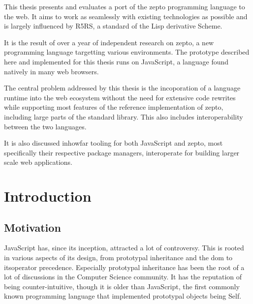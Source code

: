 \documentclass[oneside,11pt,xetex]{scrbook}
\begin{document}

This thesis presents and evaluates a port of the zepto programming language to the web. It aims to
work as seamlessly with existing technologies as possible and is largely influenced by R5RS,
a standard of the Lisp derivative Scheme.

It is the result of over a year of independent research on zepto, a new programming language
targetting various environments. The prototype described here and implemented for this
thesis runs on JavaScript, a language found natively in many web browsers.

The central problem addressed by this thesis is the incoporation of a language runtime
into the web ecosystem without the need for extensive code rewrites while supporting
most features of the reference implementation of zepto, including large parts of the
standard library. This also includes interoperability between the two languages.

It is also discussed inhowfar tooling for both JavaScript and zepto, most specifically
their respective package managers, interoperate for building larger scale web applications.

\tableofcontents

\printglossary[type=\acronymtype,title=Abbreviations]

\mainmatter

\pagestyle{headings}

\chapter{Introduction}
\label{chap:intro}

\section{Motivation}
\label{sec:Motivation}

JavaScript has, since its inception, attracted a lot of controversy. This is rooted
in various aspects of its design, from prototypal inheritance and the \gls{dom} to
itsoperator precedence. Especially prototypal inheritance  has been the root
of a lot of discussions in the Computer Science community. It has the reputation of
being counter-intuitive, though it is older than JavaScript, the first commonly known
programming language that implemented prototypal objects being Self.
\end{document}
